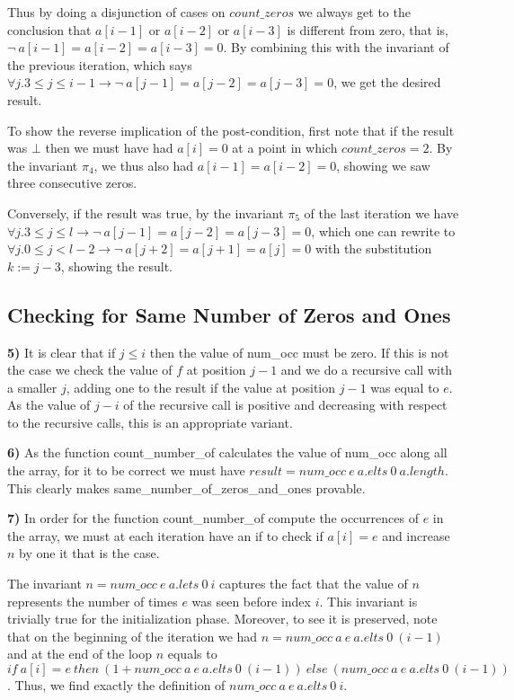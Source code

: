 \documentclass[]{StandardTemplate}
\begin{document}
Thus by doing a disjunction of cases on $ count\_zeros $ we always get to the conclusion that $ a[i-1] $ or $ a[i-2] $ or $ a[i-3] $ is different from zero, that is, $  \neg ~a[i-1]=a[i-2]=a[i-3] = 0 $. By combining this with the invariant of the previous iteration, which says $\forall j. 3 \leq j \leq i-1 \to \neg ~a[j-1]=a[j-2]=a[j-3] = 0$, we get the desired result.

To show the reverse implication of the post-condition, first note that if the result was $ \bot $ then we must have had $ a[i]=0 $ at a point in which $ count\_zeros=2 $. By the invariant $ \pi_4 $, we thus also had $ a[i-1]=a[i-2] =0$, showing we saw three consecutive zeros.

Conversely, if the result was true, by the invariant $ \pi_5 $ of the last iteration we have $ \forall j. 3 \leq j \leq l \to \neg ~a[j-1]=a[j-2]=a[j-3] = 0 $, which one can rewrite to $\forall j. 0 \leq j < l-2 \to \neg ~a[j+2]=a[j+1]=a[j] = 0$ with the substitution $ k := j - 3 $, showing the result.

\subsection{Checking for Same Number of Zeros and Ones}
\label{subsec:samenum}

\textbf{5)} It is clear that if $ j \leq i $ then the value of num\_occ must be zero. If this is not the case we check the value of $ f $ at position $ j-1 $ and we do a recursive call with a smaller $ j $, adding one to the result if the value at position $ j-1 $ was equal to $ e $. As the value of $ j-i $ of the recursive call is positive and decreasing with respect to the recursive calls, this is an appropriate variant.

\textbf{6)} As the function count\_number\_of calculates the value of num\_occ along all the array, for it to be correct we must have $ result = num\_occ~e~a.elts~0~a.length $. This clearly makes same\_number\_of\_zeros\_and\_ones provable.

\textbf{7)} In order for the function count\_number\_of compute the occurrences of $ e $ in the array, we must at each iteration have an if to check if $ a[i]=e $ and increase $ n $ by one it that is the case.

The invariant $ n = num\_occ~e~a.lets~0~i $ captures the fact that the value of $ n $ represents the number of times $ e $ was seen before index $ i $. This invariant is trivially true for the initialization phase. Moreover, to see it is preserved, note that on the beginning of the iteration we had $ n = num\_occ~a~e~a.elts~0~(i-1) $ and at the end of the loop $ n $ equals to $ if~ a[i]=e~then~(1 + num\_occ~a~e~a.elts~0~(i-1))~else~(num\_occ~a~e~a.elts~0~(i-1)) $. Thus, we find exactly the definition of $ num\_occ~a~e~a.elts~0~i $.
\end{document}
